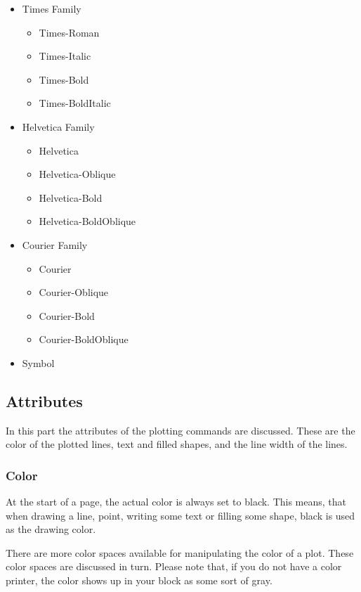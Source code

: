 \documentclass{article}
\begin{document}
\begin{itemize}
  \item Times Family
  \begin{itemize}
        \item Times-Roman
        \item Times-Italic
        \item Times-Bold
        \item Times-BoldItalic
  \end{itemize}
  \item Helvetica Family
  \begin{itemize}
        \item Helvetica
        \item Helvetica-Oblique
        \item Helvetica-Bold
        \item Helvetica-BoldOblique
  \end{itemize}
  \item Courier Family
  \begin{itemize}
        \item Courier
        \item Courier-Oblique
        \item Courier-Bold
        \item Courier-BoldOblique
  \end{itemize}
  \item Symbol
\end{itemize}



\subsection{Attributes}


In this part the attributes of the plotting commands are discussed.
These are the color of the plotted lines, text and filled shapes, and
the line width of the lines.

\subsubsection{Color}


At the start of a page, the actual color is always set to black.  This
means, that when drawing a line, point, writing some text or filling
some shape, black is used as the drawing color.

There are more color spaces available for manipulating the color of a
plot. These color spaces are discussed in turn.  Please note that, if
you do not have a color printer, the color shows up in your block as
some sort of gray.
\end{document}
